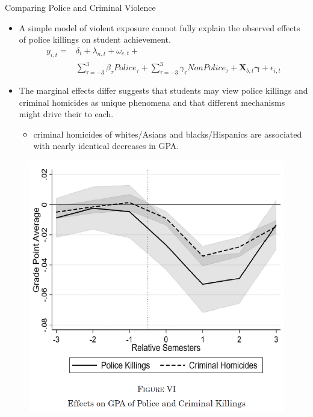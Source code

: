 \documentclass[dvipdfmx]{beamer}
\begin{document}
\begin{frame}{Comparing Police and Criminal Violence}
  \begin{itemize}
    \item A simple model of violent exposure
    cannot fully explain the observed effects of police killings on student achievement.
    \begin{align*}
      y_{i, t} = & \delta_i + \lambda_{n, t} + \omega_{c, t} + \\
      & \sum_{\tau = -3}^3 \beta_{\tau} \textit{Police}_{\tau} + \sum_{\tau = -3}^3 \gamma_{\tau} \textit{NonPolice}_{\tau} + \mathbf{X}_{b, t} \boldsymbol{\gamma} + \epsilon_{i, t}
    \end{align*}
    \item The marginal effects differ suggests that students may view police killings and criminal homicides as unique phenomena and that different mechanisms might drive their to each.
    \begin{itemize}
      \item criminal homicides of whites/Asians and blacks/Hispanics are associated with nearly identical decreases in GPA.
    \end{itemize}
  \end{itemize}
\end{frame}

\begin{frame}{}
  \begin{figure}
    \centering
    \includegraphics[scale = .55]{fig_tab/os20220113/F6}
  \end{figure}
\end{frame}
\end{document}
